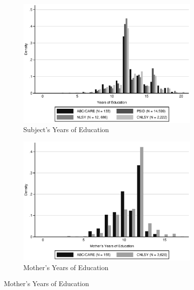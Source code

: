 \begin{figure}[H]
	\ContinuedFloat
	\begin{subfigure}[h]{0.9\textwidth}
	\centering
	\caption{Subject's Years of Education} \label{fig:support_educ}
	\includegraphics[width=\textwidth]{AppOutput/Methodology/support_educ.eps}
	\end{subfigure}
	
	\begin{subfigure}[h]{0.9\textwidth}
	\centering
	\caption{Mother's Years of Education} \label{fig:support_meduc}
	\includegraphics[width=\textwidth]{AppOutput/Methodology/support_momed.eps}
	\end{subfigure}
	
\end{figure}
	

